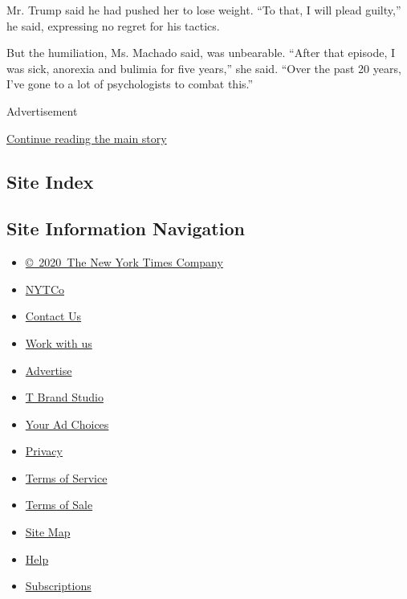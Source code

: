 Mr. Trump said he had pushed her to lose weight. ``To that, I will plead
guilty,'' he said, expressing no regret for his tactics.

But the humiliation, Ms. Machado said, was unbearable. ``After that
episode, I was sick, anorexia and bulimia for five years,'' she said.
``Over the past 20 years, I've gone to a lot of psychologists to combat
this.''

Advertisement

\protect\hyperlink{after-bottom}{Continue reading the main story}

\hypertarget{site-index}{%
\subsection{Site Index}\label{site-index}}

\hypertarget{site-information-navigation}{%
\subsection{Site Information
Navigation}\label{site-information-navigation}}

\begin{itemize}
\tightlist
\item
  \href{https://help.nytimes3xbfgragh.onion/hc/en-us/articles/115014792127-Copyright-notice}{©~2020~The
  New York Times Company}
\end{itemize}

\begin{itemize}
\tightlist
\item
  \href{https://www.nytco.com/}{NYTCo}
\item
  \href{https://help.nytimes3xbfgragh.onion/hc/en-us/articles/115015385887-Contact-Us}{Contact
  Us}
\item
  \href{https://www.nytco.com/careers/}{Work with us}
\item
  \href{https://nytmediakit.com/}{Advertise}
\item
  \href{http://www.tbrandstudio.com/}{T Brand Studio}
\item
  \href{https://www.nytimes3xbfgragh.onion/privacy/cookie-policy\#how-do-i-manage-trackers}{Your
  Ad Choices}
\item
  \href{https://www.nytimes3xbfgragh.onion/privacy}{Privacy}
\item
  \href{https://help.nytimes3xbfgragh.onion/hc/en-us/articles/115014893428-Terms-of-service}{Terms
  of Service}
\item
  \href{https://help.nytimes3xbfgragh.onion/hc/en-us/articles/115014893968-Terms-of-sale}{Terms
  of Sale}
\item
  \href{https://spiderbites.nytimes3xbfgragh.onion}{Site Map}
\item
  \href{https://help.nytimes3xbfgragh.onion/hc/en-us}{Help}
\item
  \href{https://www.nytimes3xbfgragh.onion/subscription?campaignId=37WXW}{Subscriptions}
\end{itemize}
